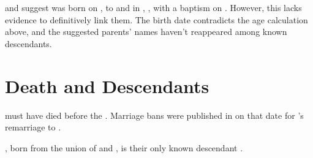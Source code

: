 \citeauthor{FS:JamesMcDonaldBaptism} and \citeauthor{settlers:JamesMcDonald} suggest \mcdonaldJName{} was born on , to \mcdonaldWWFullNames{} and \aitchisonJFullNames{} in \crawfordFull{}, \scotland{}, with a baptism on  \autocite{FS:JamesMcDonaldBaptism} \autocite{settlers:JamesMcDonald}. However, this lacks evidence to definitively link them. The birth date contradicts the age calculation above, and the suggested parents' names haven't reappeared among known descendants.

\section[Death and Descendants]{Death and Descendants}
\label{sec: Death and Descendants}

\mcdonaldJNameOnly{} must have died before the . Marriage bans were published in \grahamstown{} on that date for \welchMName{}'s remarriage to \henmanRName{} \autocite{settlers:JamesMcDonald} \autocite{settlers:MaryWelch}.

\mcdonaldAName{}, born from the union of \mcdonaldJName{} and \welchMName{}, is their only known descendant \autocite[46]{nash:1820}.